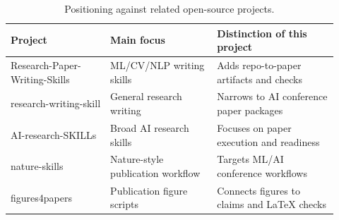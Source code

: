 \begin{table}[t]
\centering
\begin{tabular}{p{0.28\linewidth}p{0.30\linewidth}p{0.34\linewidth}}
\toprule
Project & Main focus & Distinction of this project \\
\midrule
Research-Paper-Writing-Skills & ML/CV/NLP writing skills & Adds repo-to-paper artifacts and checks \\
research-writing-skill & General research writing & Narrows to AI conference paper packages \\
AI-research-SKILLs & Broad AI research skills & Focuses on paper execution and readiness \\
nature-skills & Nature-style publication workflow & Targets ML/AI conference workflows \\
figures4papers & Publication figure scripts & Connects figures to claims and LaTeX checks \\
\bottomrule
\end{tabular}
\caption{Positioning against related open-source projects.}
\label{tab:related-projects}
\end{table}
